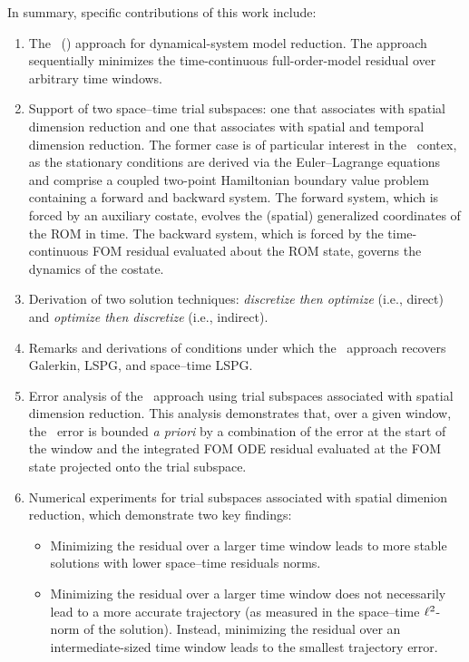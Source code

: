 \documentclass[3p,computermodern,10pt]{elsarticle}
\begin{document}
 In summary, specific contributions of this work include:
\begin{enumerate}
\item The \methodNameLower\ (\methodAcronym) approach for dynamical-system
	model reduction. The approach sequentially minimizes the time-continuous
		full-order-model residual over arbitrary time windows.
\item Support of two space--time trial subspaces: one that associates with spatial dimension reduction and 
    one that associates with spatial and temporal dimension reduction.
The former case is of particular
		interest in the \methodAcronym\  contex, as the stationary conditions are
		derived via the Euler--Lagrange equations and comprise a coupled two-point
		Hamiltonian boundary value problem containing a forward and backward
		system. The forward system, which is forced by an auxiliary costate,
		evolves the (spatial) generalized coordinates of the ROM in time. The
		backward system, which is forced by the time-continuous FOM residual
		evaluated about the ROM state, governs the dynamics of the costate. 
	\item Derivation of two solution techniques:
		\textit{discretize then optimize} (i.e., direct) and
		\textit{optimize then discretize} (i.e., indirect). 
	\item Remarks and derivations of conditions under which the
		\methodAcronym\ approach recovers Galerkin, LSPG, and space--time LSPG.
\item Error analysis of the \methodAcronym\ approach using
	trial subspaces associated with spatial dimension reduction.
	This analysis demonstrates that, over a given window, the \methodAcronymROMs\ error 
		is bounded \textit{a priori} by a combination of the
		error at the start of the window and the integrated FOM ODE residual
		evaluated at the FOM state projected onto the trial subspace. 
\item Numerical experiments for 
	trial subspaces associated with spatial dimenion reduction, which demonstrate two key findings:
\begin{itemize}
\item Minimizing the residual over a larger time window leads to more stable solutions 
with lower space--time residuals norms.
\item Minimizing the residual over a larger time window does not necessarily
	lead to a more accurate trajectory (as measured in the space--time
		$\ell^2$-norm of the solution). Instead, minimizing the residual over an
		intermediate-sized time window leads to the smallest trajectory error.
\end{itemize}
\end{enumerate}
\end{document}
